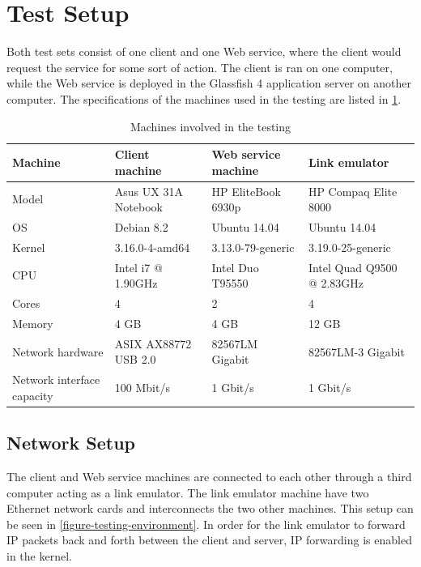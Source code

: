 \section{Test Setup}
\label{testing-environment}

Both test sets consist of one client and one Web service, where the client would
request the service for some sort of action. The client is ran on one computer,
while the Web service is deployed in the Glassfish 4 application server on
another computer. The specifications of the machines used in the testing are listed in
\cref{table-machines}.

\begin{table}[h]
\begin{tabularx}{\textwidth}{| X | X | X | X |}
\hline
  \textbf{Machine} & \textbf{Client machine} & \textbf{Web service machine} & \textbf{Link emulator}\\ \hline
  Model & Asus UX 31A Notebook & HP EliteBook 6930p & HP Compaq Elite 8000 \\ \hline
  OS & Debian 8.2 & Ubuntu 14.04 & Ubuntu 14.04\\ \hline
  Kernel & 3.16.0-4-amd64 & 3.13.0-79-generic & 3.19.0-25-generic\\ \hline
  CPU & Intel i7 @ 1.90GHz & Intel Duo T95550 & Intel Quad Q9500 @ 2.83GHz \\ \hline
  Cores & 4 & 2 & 4\\ \hline
  Memory & 4 GB & 4 GB & 12 GB\\ \hline
  Network hardware & ASIX AX88772 USB 2.0 & 82567LM Gigabit & 82567LM-3 Gigabit\\ \hline
  Network interface capacity & 100 Mbit/s & 1 Gbit/s & 1 Gbit/s \\ \hline
\end{tabularx}
\caption{Machines involved in the testing}
\label{table-machines}
\end{table}

\subsection{Network Setup}

The client and Web service machines are connected to each other through a third
computer acting as a link emulator. The link emulator machine have two Ethernet
network cards and interconnects the two other machines. This setup can be seen
in \cref{figure-testing-environment}. In order for the link emulator to forward
IP packets back and forth between the client and server, IP forwarding is
enabled in the kernel.

